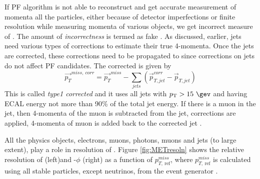 If PF algorithm is not able to reconstruct and get accurate measurement of momenta all the particles, either because of detector 
imperfections or finite resolution while measuring momenta of various objects, we get incorrect measure of \ptmiss. The amount of 
\textit{incorrectness} is termed as fake \ptmiss. As discussed, earlier, jets need various types of corrections to estimate their true 
4-momenta. Once the jets are corrected, these corrections need to be propagated to \ptmiss since corrections on jets do not affect PF 
candidates. The corrected \ptmiss is given by
\begin{equation}
\vec{p_{T}}^{miss,\ corr} = \vec{p_{T}}^{miss} - \sum_{jets}^{}(\vec{p}_{T,jet}^{corr} - \vec{p}_{T,jet}) 
\end{equation}
This \ptmiss is called \textit{type1 corrected \ptmiss} and it uses all jets with $\pt > 15\ \gev$ and having ECAL energy not more than 
90\% of the total jet energy. If there is a muon in the jet, then 4-momenta of the muon is subtracted from the jet, corrections are 
applied, 4-momenta of muon is added back to the corrected jet \cite{CMS-PAS-JME-16-004}.

All the physics objects, electrons, muons, photons, muons and jets (to large extent), play a role in resolution of \ptmiss. Figure 
\ref{fig:METresoln} shows the relative resolution of \ptmiss (left)and \ptmiss-$\phi$ (right) as a function of $p_{T,\ 
\mathrm{ref}}^{miss}$, where $p_{T,\ \mathrm{ref}}^{miss}$ is calculated using all stable particles, except neutrinos, from the event 
generator \cite{CMS-PRF-14-001}.